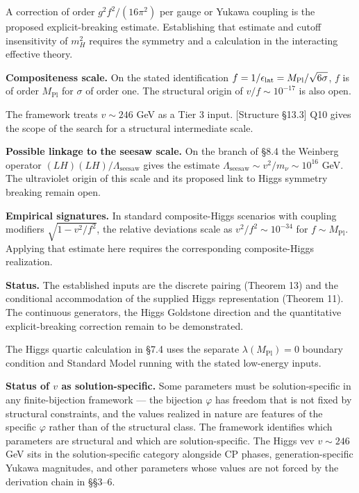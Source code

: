 \documentclass[
]{article}
\begin{document}
A correction of order \(g^2 f^2/(16\pi^2)\) per gauge or Yukawa coupling
is the proposed explicit-breaking estimate. Establishing that estimate
and cutoff insensitivity of \(m_H^2\) requires the symmetry and a
calculation in the interacting effective theory.

\textbf{Compositeness scale.} On the stated identification
\(f=1/\epsilon_{\rm lat}=M_{\mathrm{Pl}}/\sqrt{6\sigma}\), \(f\) is of
order \(M_{\mathrm{Pl}}\) for \(\sigma\) of order one. The structural
origin of \(v/f\sim 10^{-17}\) is also open.

The framework treats \(v\sim 246\) GeV as a Tier 3 input. {[}Structure
§13.3{]} Q10 gives the scope of the search for a structural intermediate
scale.

\textbf{Possible linkage to the seesaw scale.} On the branch of §8.4 the
Weinberg operator \((LH)(LH)/\Lambda_{\mathrm{seesaw}}\) gives the
estimate \(\Lambda_{\mathrm{seesaw}}\sim v^2/m_\nu\sim 10^{16}\) GeV.
The ultraviolet origin of this scale and its proposed link to Higgs
symmetry breaking remain open.

\textbf{Empirical signatures.} In standard composite-Higgs scenarios
with coupling modifiers \(\sqrt{1-v^2/f^2}\), the relative deviations
scale as \(v^2/f^2\sim 10^{-34}\) for \(f\sim M_{\mathrm{Pl}}\).
Applying that estimate here requires the corresponding composite-Higgs
realization.

\textbf{Status.} The established inputs are the discrete pairing
(Theorem 13) and the conditional accommodation of the supplied Higgs
representation (Theorem 11). The continuous generators, the Higgs
Goldstone direction and the quantitative explicit-breaking correction
remain to be demonstrated.

The Higgs quartic calculation in §7.4 uses the separate
\(\lambda(M_{\mathrm{Pl}})=0\) boundary condition and Standard Model
running with the stated low-energy inputs.

\textbf{Status of \(v\) as solution-specific.} Some parameters must be
solution-specific in any finite-bijection framework --- the bijection
\(\varphi\) has freedom that is not fixed by structural constraints, and
the values realized in nature are features of the specific \(\varphi\)
rather than of the structural class. The framework identifies which
parameters are structural and which are solution-specific. The Higgs vev
\(v \sim 246\) GeV sits in the solution-specific category alongside CP
phases, generation-specific Yukawa magnitudes, and other parameters
whose values are not forced by the derivation chain in §§3--6.
\end{document}
